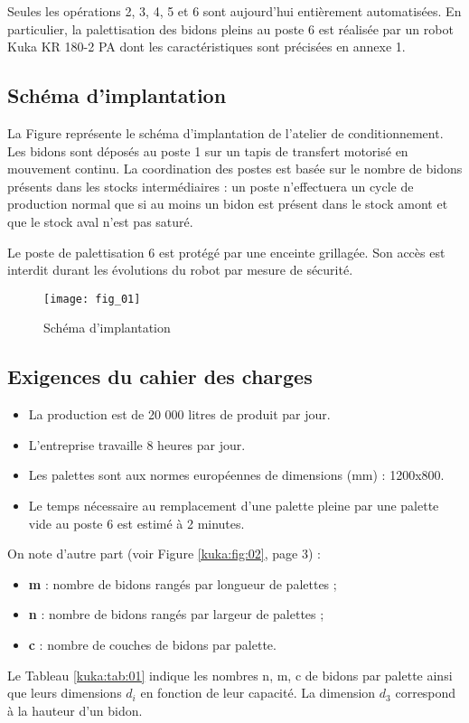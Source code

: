 \vspace{.4cm}

Seules les opérations 2, 3, 4, 5 et 6 sont aujourd’hui entièrement automatisées. En particulier, 
la palettisation des bidons pleins au poste 6 est réalisée par un robot Kuka KR 180-2 PA dont 
les caractéristiques sont précisées en annexe 1.

\subsection{Schéma d’implantation}
La Figure \label{kuka:kuka:fig:01} représente le schéma d’implantation de l’atelier de conditionnement. Les 
bidons sont déposés au poste 1 sur un tapis de transfert motorisé en mouvement continu. La 
coordination des postes est basée sur le nombre de bidons présents dans les stocks 
intermédiaires : un poste n’effectuera un cycle de production normal que si au moins un bidon 
est présent dans le stock amont et que le stock aval n’est pas saturé.

Le poste de palettisation 6 est protégé par une enceinte grillagée. Son accès est interdit durant 
les évolutions du robot par mesure de sécurité. 


\begin{figure}[H]
\centering
\texttt{[image: fig\_01]}
\caption{Schéma d'implantation \label{kuka:fig:01}}
\end{figure}

\subsection{Exigences du cahier des charges}
\begin{itemize}
\item La production est de 20 000 litres de produit par jour. 
\item L’entreprise travaille 8 heures par jour. 
\item Les palettes sont aux normes européennes de dimensions (mm) : 1200x800. 
\item Le temps nécessaire au remplacement d’une palette pleine par une palette vide au 
poste 6 est estimé à 2 minutes. 
\end{itemize}
On note d’autre part (voir Figure \ref{kuka:fig:02}, page 3) :
\begin{itemize}
\item \textbf{m} : nombre de bidons rangés par longueur de palettes ; 
\item \textbf{n} : nombre de bidons rangés par largeur de palettes ; 
\item \textbf{c} : nombre de couches de bidons par palette. 
\end{itemize}
Le Tableau \ref{kuka:tab:01} indique les nombres n, m, c de bidons par palette ainsi que leurs 
dimensions $d_i$ en fonction de leur capacité. La dimension $d_3$ correspond à la hauteur d’un 
bidon. 



